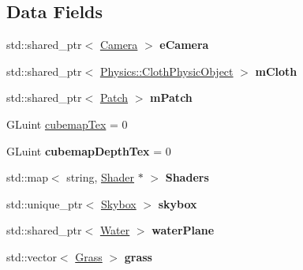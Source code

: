 \subsection*{Data Fields}
\begin{DoxyCompactItemize}
\item 
std\+::shared\+\_\+ptr$<$ \hyperlink{class_camera}{Camera} $>$ {\bfseries e\+Camera}\hypertarget{class_epsilon_abfaacae6aa330a03d4c9ad5ea64e2a0c}{}\label{class_epsilon_abfaacae6aa330a03d4c9ad5ea64e2a0c}

\item 
std\+::shared\+\_\+ptr$<$ \hyperlink{class_physics_1_1_cloth_physic_object}{Physics\+::\+Cloth\+Physic\+Object} $>$ {\bfseries m\+Cloth}\hypertarget{class_epsilon_a201fc9489e5df35b08e7e88f26c05576}{}\label{class_epsilon_a201fc9489e5df35b08e7e88f26c05576}

\item 
std\+::shared\+\_\+ptr$<$ \hyperlink{class_patch}{Patch} $>$ {\bfseries m\+Patch}\hypertarget{class_epsilon_a42be8b163d188604f22956fec5228798}{}\label{class_epsilon_a42be8b163d188604f22956fec5228798}

\item 
G\+Luint \hyperlink{class_epsilon_a373ecfeb0f2da56ea44c70fd24a04a53}{cubemap\+Tex} = 0
\item 
G\+Luint {\bfseries cubemap\+Depth\+Tex} = 0\hypertarget{class_epsilon_a02bed2e9746800ffd4b355535b12abcc}{}\label{class_epsilon_a02bed2e9746800ffd4b355535b12abcc}

\item 
std\+::map$<$ string, \hyperlink{class_shader}{Shader} $\ast$ $>$ {\bfseries Shaders}\hypertarget{class_epsilon_a80c03a3455fad80a7e146ebb04a8a2fd}{}\label{class_epsilon_a80c03a3455fad80a7e146ebb04a8a2fd}

\item 
std\+::unique\+\_\+ptr$<$ \hyperlink{class_skybox}{Skybox} $>$ {\bfseries skybox}\hypertarget{class_epsilon_aa213c255e2fd3fde8d815106d193a031}{}\label{class_epsilon_aa213c255e2fd3fde8d815106d193a031}

\item 
std\+::shared\+\_\+ptr$<$ \hyperlink{class_water}{Water} $>$ {\bfseries water\+Plane}\hypertarget{class_epsilon_a6aa1464c9d08a34a80262f56f25efaff}{}\label{class_epsilon_a6aa1464c9d08a34a80262f56f25efaff}

\item 
std\+::vector$<$ \hyperlink{class_grass}{Grass} $>$ {\bfseries grass}\hypertarget{class_epsilon_ae0a6e3e7c24c4ea1ed750ffc039f5852}{}\label{class_epsilon_ae0a6e3e7c24c4ea1ed750ffc039f5852}


\end{DoxyCompactItemize}
